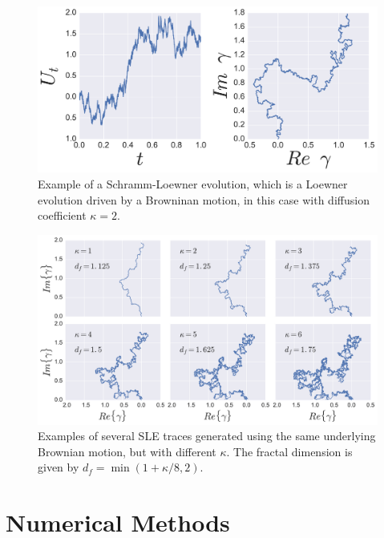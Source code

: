 \begin{figure}
\begin{center}
    \includegraphics[width=\textwidth]{chapters/ch4-sle/figs/sleexample}
\end{center}
\caption{Example of a Schramm-Loewner evolution, which is a Loewner evolution
    driven by a Browninan motion, in this case with diffusion coefficient
    $\kappa=2$.}
\label{fig:sleexample}
\end{figure}

\begin{figure}
\begin{center}
    \includegraphics[scale=0.5]{chapters/ch4-sle/figs/slefracdim}
\end{center}
\caption{Examples of several SLE traces generated using the same underlying
    Brownian motion, but with different $\kappa$. The fractal dimension is
    given by $d_f=\min(1+\kappa/8, 2)$.}
\label{fig:slefracdim}
\end{figure}


\section{Numerical Methods}
\label{sec:num}

